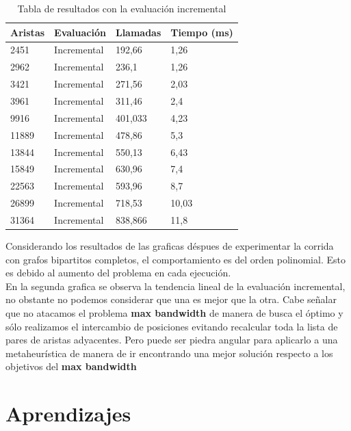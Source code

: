 \documentclass[oneside,onecolumn]{article}
\begin{document}
\begin{table}[h]
  \caption{Tabla de resultados con la evaluación incremental}
  \centering
  \begin{tabular}{|l|l|l|l|}
    \hline
    Aristas  & Evaluación  & Llamadas & Tiempo (ms) \\ \hline
    2451 & Incremental & 192,66   & 1,26        \\ \hline
    2962 & Incremental & 236,1    & 1,26        \\ \hline
    3421 & Incremental & 271,56   & 2,03        \\ \hline
    3961 & Incremental & 311,46   & 2,4         \\ \hline
    9916 & Incremental & 401,033  & 4,23        \\ \hline
    11889 & Incremental & 478,86   & 5,3         \\ \hline
    13844 & Incremental & 550,13   & 6,43        \\ \hline
    15849 & Incremental & 630,96   & 7,4         \\ \hline
    22563 & Incremental & 593,96   & 8,7         \\ \hline
    26899 & Incremental & 718,53   & 10,03       \\ \hline
    31364 & Incremental & 838,866  & 11,8        \\ \hline
  \end{tabular}
\end{table}



Considerando los resultados de las graficas déspues de experimentar la corrida con grafos bipartitos completos, el comportamiento es del orden polinomial. Esto es debido al aumento del problema en cada ejecución.\\

En la segunda grafica se observa la tendencia lineal de la evaluación incremental, no obstante no podemos considerar que una es mejor que la otra. Cabe señalar que no atacamos el problema \textbf{max bandwidth} de manera de busca el óptimo y sólo realizamos el intercambio de posiciones evitando recalcular toda la lista de pares de aristas adyacentes. Pero puede ser piedra angular para aplicarlo a una metaheurística de manera de ir encontrando una mejor solución respecto a los objetivos del \textbf{max bandwidth}


\newpage
\section{Aprendizajes}
\end{document}
